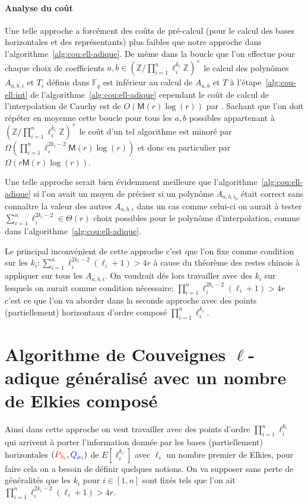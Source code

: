 \documentclass[10pt,a4paper]{book}
\theoremstyle{plain}
\theoremstyle{definition}
\theoremstyle{definition}
\theoremstyle{definition}
\theoremstyle{definition}
\theoremstyle{remark}
\theoremstyle{remark}
\theoremstyle{definition}
\begin{document}
\paragraph{Analyse du coût}
{Une telle approche a forcément des coûts de pré-calcul (pour le calcul des bases 
horizontales et des représentants) plus faibles que notre approche dans 
l'algorithme~\ref{alg:cou:ell-adique}. De même dans la boucle que l'on effectue
 pour chaque choix de coefficients $a,b \in (\mathbb{Z}/\prod_{i=1}^n\ell_i^{k_i} \mathbb{Z})^{\times}$
le calcul des polynômes $A_{a,b,i}$ et $T_i$ définis dans $\mathbb{F}_q$ est 
inférieur au calcul de $A_{a,b}$ et $T$ à l'étape~\ref{alg:cou-ell:int} de 
l'algorithme~\ref{alg:cou:ell-adique} cependant le coût de calcul de 
l'interpolation de Cauchy  est de $O(\mathsf{M}(r)\log(r))$ par
 \cite[Théorème 7.5]{algeff17}. Sachant que l'on doit répéter en moyenne cette 
boucle pour tous les $a,b$ possibles appartenant à $(\mathbb{Z}/\prod_{i=1}^n\ell_i^{k_i} \mathbb{Z})^{\times}$
 le coût d'un tel algorithme est minoré par $\Omega(\prod_{i=1}^n\ell_i^{2k_i-2}
 \mathsf{M}(r)\log(r))$ et donc en particulier par $\Omega(r\mathsf{M}(r)
 \log(r))$. 

Une telle approche serait bien évidemment meilleure que 
l'algorithme~\ref{alg:cou:ell-adique} si l'on avait un moyen de préciser si un 
polynôme $A_{a,b,i_0}$ était correct sans connaître la valeur des autres 
$A_{a,b,i}$ dans un cas comme celui-ci on aurait à tester 
$\sum_{i=1}^n \ell_i^{2k_i-2} \in \Theta(r)$ choix possibles pour le polynôme 
d'interpolation, comme dans l'algorithme~\ref{alg:cou:ell-adique}.

Le principal inconvénient de cette approche 
c'est que l'on fixe comme condition sur les $k_i: \sum_{i=1}^n\ell_i^{2k_{i}-2}(\ell_i+1)>4r$
à cause du théorème des restes chinois à appliquer sur tous les $A_{a,b,i}$. 
On voudrait dés lors travailler avec des $k_i$ sur lesquels on aurait comme 
condition nécessaire: $\prod_{i=1}^n\ell_i^{2k_{i}-2}(\ell_i+1)>4r$
c'est ce que l'on va aborder dans la seconde approche avec des points 
(partiellement) horizontaux d'ordre composé $\prod_{i=1}^n \ell_i^{k_i}$.}

\section{Algorithme de Couveignes $\ell$-adique généralisé avec un nombre de Elkies composé}
Ainsi dans cette approche on veut travailler avec des points d'ordre 
$\prod_{i=1}^{n} \ell_i^{k_i}$ qui arrivent à porter l'information donnée par 
les  bases (partiellement) horizontales 
$(\color{red}P_{\lambda_i}\color{black},\color{blue}Q_{\mu_i}\color{black})$ de 
$E[\ell_i^{k_i}]$ avec $\ell_i$ un nombre premier de Elkies, pour faire cela on
a besoin de définir quelques notions. On
va supposer sans perte de généralités que les $k_i$ pour $i \in [1,n]$ sont 
fixés tels que l'on ait $\prod_{i=1}^{n} \ell_i^{2k_i-2}(\ell_i+1)>4r$.
\end{document}
